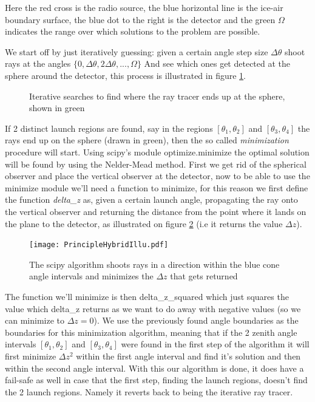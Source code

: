 Here the red cross is the radio source, the blue horizontal line is the ice-air
boundary surface, the blue dot to the right is the detector and the green
$\Omega$ indicates the range over which solutions to the problem are possible.

We start off by just iteratively guessing: given a certain angle step size
$\Delta \theta$ shoot rays at the angles $\{0,\Delta \theta, 2\Delta
\theta,...,\Omega\}$ And see which ones get detected at the sphere around the
detector, this process is illustrated in figure \ref{figure:First step hybrid}.
\begin{figure}
	\centering
	\caption{Iterative searches to find where the ray tracer ends up at the sphere, shown in green}
	\label{figure:First step hybrid}
\end{figure}

If 2 distinct launch regions are found, say in the regions
$[\theta_1,\theta_2]$ and $[\theta_3,\theta_4]$ the rays end up on the sphere
(drawn in green), then the so called \textit{minimization} procedure will
start. Using scipy's module optimize.minimize the optimal solution will be
found by using the Nelder-Mead method\cite{10.1093/comjnl/7.4.308}. First we
get rid of the spherical observer and place the vertical observer at the
detector, now to be able to use the minimize module we'll need a function to
minimize, for this reason we first define the function \textit{delta\_z} as,
given a certain launch angle, propagating the ray onto the vertical observer
and returning the distance from the point where it lands on the plane to the
detector, as illustrated on figure \ref{fig:PrincipleHybridIllu} (i.e it
returns the value $\Delta z$).
\begin{figure}
  \centering
  \texttt{[image: PrincipleHybridIllu.pdf]}
  \caption{The scipy algorithm shoots rays in a direction within the blue cone angle intervals and minimizes the $\Delta z$ that gets returned}
  \label{fig:PrincipleHybridIllu}
\end{figure}
The function we'll minimize is then delta\_z\_squared which just squares the
value which delta\_z returns as we want to do away with negative values (so we
can minimize to $\Delta z=0$). We use the previously found angle boundaries as
the boundaries for this minimization algorithm, meaning that if the 2 zenith
angle intervals $[\theta_1,\theta_2]$ and $[\theta_3,\theta_4]$ were found in
the first step of the algorithm it will first minimize $\Delta z^2$ within the
first angle interval and find it's solution and then within the second angle
interval. With this our algorithm is done, it does have a fail-safe as well in case
that the first step, finding the launch regions, doesn't find the 2 launch
regions.  Namely it reverts back to being the iterative ray tracer.

